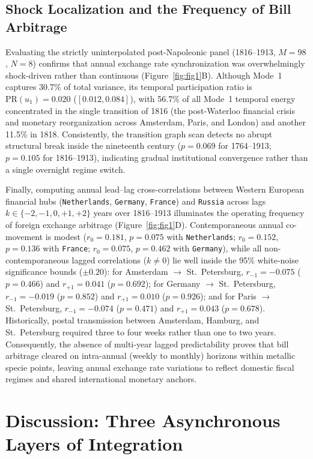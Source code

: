 \documentclass[11pt,a4paper]{article}
\begin{document}
\subsection{Shock Localization and the Frequency of Bill Arbitrage}
Evaluating the strictly uninterpolated post-Napoleonic panel (1816--1913, $M = 98$, $N = 8$) confirms that annual exchange rate synchronization was overwhelmingly shock-driven rather than continuous (Figure~\ref{fig:fig1}B). Although Mode~1 captures 30.7\% of total variance, its temporal participation ratio is $\mathrm{PR}(u_1) = 0.020$ ($[0.012, 0.084]$), with 56.7\% of all Mode~1 temporal energy concentrated in the single transition of 1816 (the post-Waterloo financial crisis and monetary reorganization across Amsterdam, Paris, and London) and another 11.5\% in 1818. Consistently, the transition graph scan detects no abrupt structural break inside the nineteenth century ($p = 0.069$ for 1764--1913; $p = 0.105$ for 1816--1913), indicating gradual institutional convergence rather than a single overnight regime switch.

Finally, computing annual lead--lag cross-correlations between Western European financial hubs (\texttt{Netherlands}, \texttt{Germany}, \texttt{France}) and \texttt{Russia} across lags $k \in \{-2, -1, 0, +1, +2\}$ years over 1816--1913 illuminates the operating frequency of foreign exchange arbitrage (Figure~\ref{fig:fig1}D). Contemporaneous annual co-movement is modest ($r_0 = 0.181$, $p = 0.075$ with \texttt{Netherlands}; $r_0 = 0.152$, $p = 0.136$ with \texttt{France}; $r_0 = 0.075$, $p = 0.462$ with \texttt{Germany}), while all non-contemporaneous lagged correlations ($k \neq 0$) lie well inside the 95\% white-noise significance bounds ($\pm 0.20$): for Amsterdam $\to$ St.~Petersburg, $r_{-1} = -0.075$ ($p = 0.466$) and $r_{+1} = 0.041$ ($p = 0.692$); for Germany $\to$ St.~Petersburg, $r_{-1} = -0.019$ ($p = 0.852$) and $r_{+1} = 0.010$ ($p = 0.926$); and for Paris $\to$ St.~Petersburg, $r_{-1} = -0.074$ ($p = 0.471$) and $r_{+1} = 0.043$ ($p = 0.678$). Historically, postal transmission between Amsterdam, Hamburg, and St.~Petersburg required three to four weeks rather than one to two years. Consequently, the absence of multi-year lagged predictability proves that bill arbitrage cleared on intra-annual (weekly to monthly) horizons within metallic specie points, leaving annual exchange rate variations to reflect domestic fiscal regimes and shared international monetary anchors.

\section{Discussion: Three Asynchronous Layers of Integration}
\end{document}
